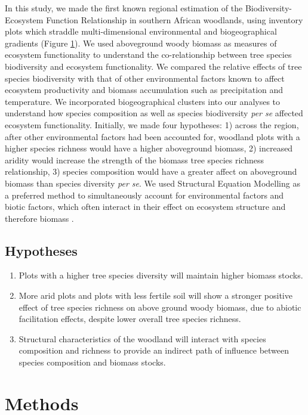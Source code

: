 \documentclass[11pt,a4paper]{article}
\begin{document}
In this study, we made the first known regional estimation of the Biodiversity-Ecosystem Function Relationship in southern African woodlands, using inventory plots which straddle multi-dimensional environmental and biogeographical gradients (Figure \ref{}). We used aboveground woody biomass  as measures of ecosystem functionality to understand the co-relationship between tree species biodiversity and ecosystem functionality. We compared the relative effects of tree species biodiversity with that of other environmental factors known to affect ecosystem productivity and biomass accumulation such as precipitation and temperature. We incorporated biogeographical clusters \citep{} into our analyses to understand how species composition as well as species biodiversity \textit{per se} affected ecosystem functionality. Initially, we made four hypotheses: 1) across the region, after other environmental factors had been accounted for, woodland plots with a higher species richness would have a higher aboveground biomass, 2) increased aridity would increase the strength of the biomass tree species richness relationship, 3) species composition would have a greater affect on aboveground biomass than species diversity \textit{per se}. We used Structural Equation Modelling as a preferred method to simultaneously account for environmental factors and biotic factors, which often interact in their effect on ecosystem structure and therefore biomass \citep{}.


\subsection{Hypotheses}

\begin{enumerate}
	\item{Plots with a higher tree species diversity will maintain higher biomass stocks.}
	\item{More arid plots and plots with less fertile soil will show a stronger positive effect of tree species richness on above ground woody biomass, due to abiotic facilitation effects, despite lower overall tree species richness.}
	\item{Structural characteristics of the woodland will interact with species composition and richness to provide an indirect path of influence between species composition and biomass stocks.}
\end{enumerate}


\section{Methods}
\end{document}
